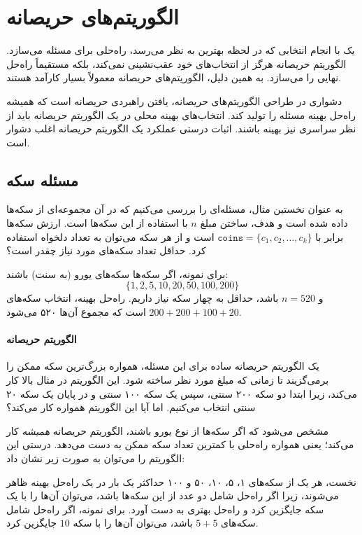 \chapter{الگوریتم‌های حریصانه}


یک 
با انجام انتخابی که در لحظه بهترین به نظر می‌رسد،
راه‌حلی برای مسئله می‌سازد.
الگوریتم حریصانه هرگز از انتخاب‌های خود عقب‌نشینی نمی‌کند،
بلکه مستقیماً راه‌حل نهایی را می‌سازد.
به همین دلیل، الگوریتم‌های حریصانه
معمولاً بسیار کارآمد هستند.

دشواری در طراحی الگوریتم‌های حریصانه،
یافتن راهبردی حریصانه است
که همیشه راه‌حل بهینه مسئله را تولید کند.
انتخاب‌های بهینه محلی در یک الگوریتم حریصانه
باید از نظر سراسری نیز بهینه باشند.
اثبات درستی عملکرد یک الگوریتم حریصانه اغلب دشوار است.

\section{مسئله سکه}

به عنوان نخستین مثال، مسئله‌ای را بررسی می‌کنیم
که در آن مجموعه‌ای از سکه‌ها داده شده است
و هدف، ساختن مبلغ $n$ با استفاده از این سکه‌ها است.
ارزش سکه‌ها برابر با
$\texttt{coins}=\{c_1,c_2,\ldots,c_k\}$
است و از هر سکه می‌توان به تعداد دلخواه استفاده کرد.
حداقل تعداد سکه‌های مورد نیاز چقدر است؟

برای نمونه، اگر سکه‌ها سکه‌های یورو (به سنت) باشند:
\[\{1,2,5,10,20,50,100,200\}\]
و $n=520$ باشد،
حداقل به چهار سکه نیاز داریم.
راه‌حل بهینه، انتخاب سکه‌های
$200+200+100+20$ است که مجموع آن‌ها ۵۲۰ می‌شود.

\subsubsection{الگوریتم حریصانه}

یک الگوریتم حریصانه ساده برای این مسئله،
همواره بزرگ‌ترین سکه ممکن را برمی‌گزیند
تا زمانی که مبلغ مورد نظر ساخته شود.
این الگوریتم در مثال بالا کار می‌کند،
زیرا ابتدا دو سکه ۲۰۰ سنتی،
سپس یک سکه ۱۰۰ سنتی و در پایان یک سکه ۲۰ سنتی انتخاب می‌کنیم.
اما آیا این الگوریتم همواره کار می‌کند؟

مشخص می‌شود که اگر سکه‌ها از نوع یورو باشند،
الگوریتم حریصانه \emph{همیشه} کار می‌کند؛ یعنی
همواره راه‌حلی با کمترین تعداد سکه ممکن به دست می‌دهد.
درستی این الگوریتم را می‌توان به صورت زیر نشان داد:

نخست، هر یک از سکه‌های ۱، ۵، ۱۰، ۵۰ و ۱۰۰
حداکثر یک بار در یک راه‌حل بهینه ظاهر می‌شوند،
زیرا اگر راه‌حل شامل دو عدد از این سکه‌ها باشد،
می‌توان آن‌ها را با یک سکه جایگزین کرد و
راه‌حل بهتری به دست آورد.
برای نمونه، اگر راه‌حل شامل سکه‌های $5+5$ باشد،
می‌توان آن‌ها را با سکه $10$ جایگزین کرد.

